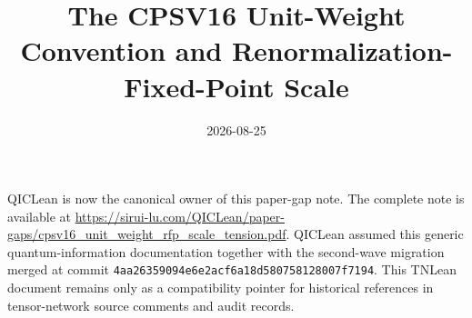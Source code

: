 \documentclass{article}
\title{The CPSV16 Unit-Weight Convention and Renormalization-Fixed-Point Scale}
\author{}
\date{2026-08-25}
\begin{document}
\maketitle
{}

QICLean is now the canonical owner of this paper-gap note. The complete note
is available at
\url{https://sirui-lu.com/QICLean/paper-gaps/cpsv16_unit_weight_rfp_scale_tension.pdf}.
QICLean assumed this generic quantum-information documentation together with
the second-wave migration merged at commit
\texttt{4aa26359094e6e2acf6a18d580758128007f7194}. This TNLean document remains
only as a compatibility pointer for historical references in tensor-network
source comments and audit records.
\end{document}
